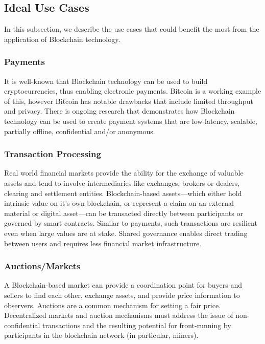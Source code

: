 
\subsection{Ideal Use Cases}
In this subsection, we describe the use cases that could benefit the most from the application of Blockchain technology.

\subsubsection{Payments}
It is well-known that Blockchain technology can be used to build cryptocurrencies, thus enabling electronic payments.
Bitcoin is a working example of this, however Bitcoin has notable drawbacks that include limited throughput and privacy.
There is ongoing research that demonstrates how Blockchain technology can be used to create payment systems that are low-latency, scalable, partially offline, confidential and/or anonymous.

\subsubsection{Transaction Processing} %
Real world financial markets provide the ability for the exchange of valuable assets and tend to involve intermediaries like exchanges, brokers or dealers, clearing and settlement entities. 
Blockchain-based assets---which either hold intrinsic value on it's own blockchain, or represent a claim on an external material or digital asset---can be transacted directly between participants or governed by smart contracts.
Similar to payments, such transactions are resilient even when large values are at stake.
Shared governance enables direct trading between users and requires less financial market infrastructure.  

\subsubsection{Auctions/Markets}
A Blockchain-based market can provide a coordination point for buyers and sellers to find each other, exchange assets, and provide price information to observers. 
Auctions are a common mechanism for setting a fair price. 
Decentralized markets and auction mechanisms must address the issue of non-confidential transactions and the resulting potential for front-running by participants in the blockchain network (in particular, miners).

